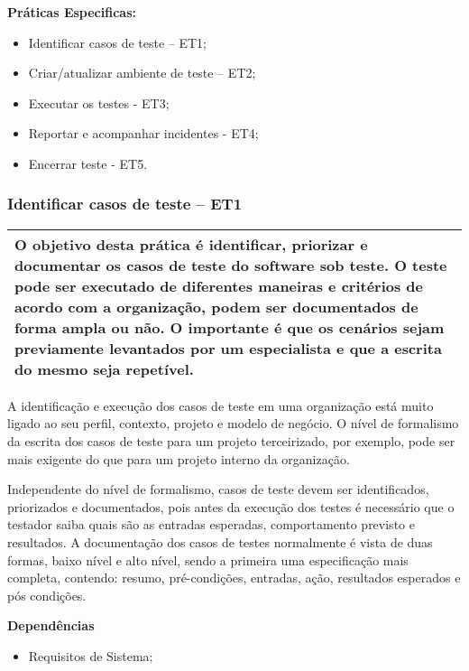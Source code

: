 \textbf{Práticas Especificas:}
\begin{itemize}
    \item Identificar casos de teste – ET1;
    \item Criar/atualizar ambiente de teste – ET2;
    \item Executar os testes - ET3;
    \item Reportar e acompanhar incidentes - ET4;
    \item Encerrar teste - ET5.
\end{itemize}

\subsubsection{Identificar casos de teste – ET1}
\label{sec:et1}

\begin{table}[!ht]
\centering
\begin{tabular}{|p{130mm}|}
\hline
O objetivo desta prática é identificar, priorizar e documentar os casos de teste do software sob teste. O teste pode ser executado de diferentes maneiras e critérios de acordo com a organização, podem ser documentados de forma ampla ou não. O importante é que os cenários sejam previamente levantados por um especialista e que a escrita do mesmo seja repetível. \\ 
\hline
\end{tabular}
\end{table}

A identificação e execução dos casos de teste em uma organização está muito ligado ao seu perfil, contexto, projeto e modelo de negócio. O nível de formalismo da escrita dos casos de teste para um projeto terceirizado, por exemplo, pode ser mais exigente do que para um projeto interno da organização.

Independente do nível de formalismo, casos de teste devem ser identificados, priorizados e documentados, pois antes da execução dos testes é necessário que o testador saiba quais são as entradas esperadas, comportamento previsto e resultados. A documentação dos casos de testes normalmente é vista de duas formas, baixo nível e alto nível, sendo a primeira uma especificação mais completa, contendo: resumo, pré-condições, entradas, ação, resultados esperados e pós condições.

\textbf{Dependências}
\begin{itemize}
    \item Requisitos de Sistema;
\end{itemize}

